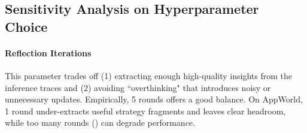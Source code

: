 \begin{table}[!tbhp]
  \centering
  \caption{\textbf{Ablation on Incremental Context Updates (AppWorld, DeepSeek-V3.1).} We run offline context adaptation with \name with/without incremental updates and evaluate on test-normal. Improvements are relative to \texttt{ReAct}.}
  \label{tab:appworld-ablation-incremental-update}
\end{table}


\subsection{Sensitivity Analysis on Hyperparameter Choice}
\label{subsec:hyperparam-sensitivity}

\paragraph{Reflection Iterations}
This parameter trades off (1) extracting enough high-quality insights from the inference traces and (2) avoiding ``overthinking" that introduces noisy or unnecessary updates. Empirically, 5 rounds offers a good balance. On AppWorld, 1 round under-extracts useful strategy fragments and leaves clear headroom, while too many rounds () can degrade performance.

